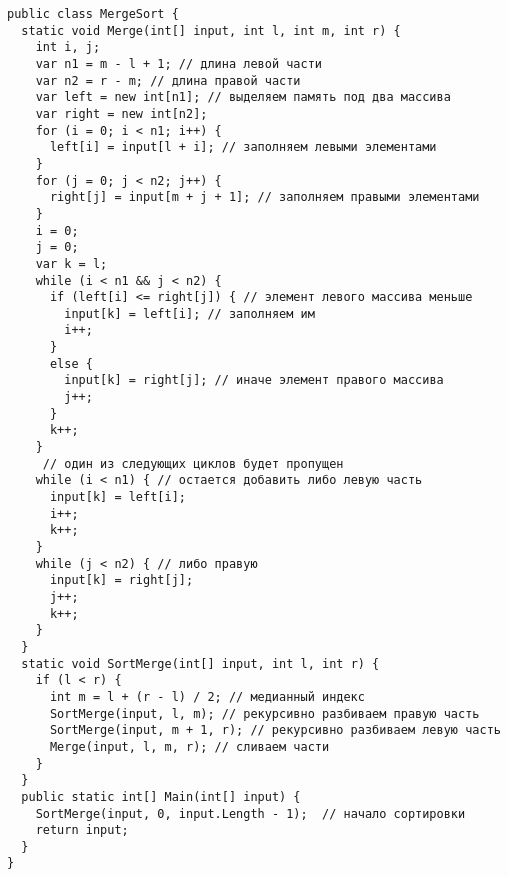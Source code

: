 \begin{tcolorbox}
\begin{verbatim}
public class MergeSort {
  static void Merge(int[] input, int l, int m, int r) {
    int i, j;
    var n1 = m - l + 1; // длина левой части
    var n2 = r - m; // длина правой части
    var left = new int[n1]; // выделяем память под два массива
    var right = new int[n2];
    for (i = 0; i < n1; i++) {
      left[i] = input[l + i]; // заполняем левыми элементами
    }
    for (j = 0; j < n2; j++) {
      right[j] = input[m + j + 1]; // заполняем правыми элементами
    }
    i = 0;
    j = 0;
    var k = l;
    while (i < n1 && j < n2) {
      if (left[i] <= right[j]) { // элемент левого массива меньше
        input[k] = left[i]; // заполняем им
        i++;
      }
      else {
        input[k] = right[j]; // иначе элемент правого массива
        j++;
      }
      k++;
    }
     // один из следующих циклов будет пропущен
    while (i < n1) { // остается добавить либо левую часть
      input[k] = left[i];
      i++;
      k++;
    }
    while (j < n2) { // либо правую
      input[k] = right[j];
      j++;
      k++;
    }
  }
  static void SortMerge(int[] input, int l, int r) {
    if (l < r) {
      int m = l + (r - l) / 2; // медианный индекс
      SortMerge(input, l, m); // рекурсивно разбиваем правую часть
      SortMerge(input, m + 1, r); // рекурсивно разбиваем левую часть
      Merge(input, l, m, r); // сливаем части
    }
  }
  public static int[] Main(int[] input) {
    SortMerge(input, 0, input.Length - 1);  // начало сортировки
    return input;
  }
}
\end{verbatim}
\end{tcolorbox}
